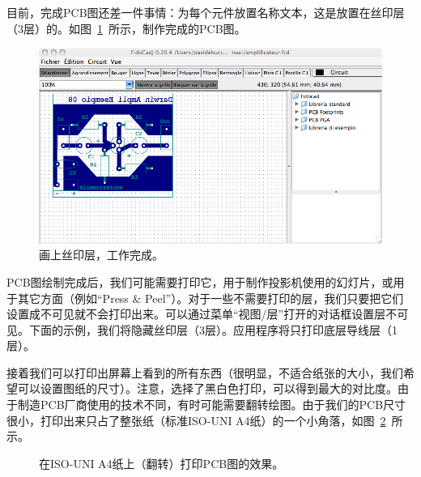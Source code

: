 \documentclass[10pt,a4paper,twoside]{scrreprt}
\begin{document}
目前，完成PCB图还差一件事情：为每个元件放置名称文本，这是放置在丝印层（3层）的。如图~\ref{fig_amplificateur_complet}~所示，制作完成的PCB图。

\begin{figure}
\includegraphics[width=1\textwidth]{amplificateur_complet} 
\caption{画上丝印层，工作完成。}
\label{fig_amplificateur_complet} 
\end{figure}

PCB图绘制完成后，我们可能需要打印它，用于制作投影机使用的幻灯片，或用于其它方面（例如“Press \& Peel”）。对于一些不需要打印的层，我们只要把它们设置成不可见就不会打印出来。可以通过菜单“视图/层”打开的对话框设置层不可见。下面的示例，我们将隐藏丝印层（3层）。应用程序将只打印底层导线层（1层）。

接着我们可以打印出屏幕上看到的所有东西（很明显，不适合纸张的大小，我们希望可以设置图纸的尺寸）。注意，选择了黑白色打印，可以得到最大的对比度。由于制造PCB厂商使用的技术不同，有时可能需要翻转绘图。由于我们的PCB尺寸很小，打印出来只占了整张纸（标准ISO-UNI A4纸）的一个小角落，如图~\ref{fig_amplificateur_impression}~所示。

\begin{figure}
\centering {} 
\caption{在ISO-UNI A4纸上（翻转）打印PCB图的效果。}
\label{fig_amplificateur_impression} 
\end{figure}
\end{document}
